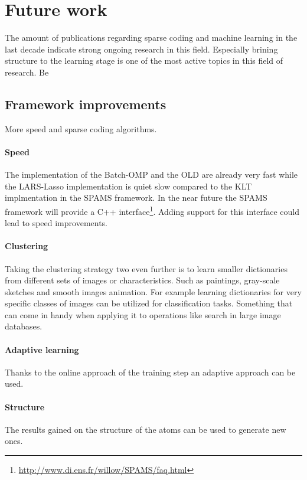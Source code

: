 \section{Future work}
The amount of publications regarding sparse coding and machine learning in the
last decade indicate strong ongoing research in this field. Especially
brining structure to the learning stage is one of the most active topics in this
field of research. Be



\subsection{Framework improvements}
More speed and sparse coding algorithms.
\paragraph{Speed}
The implementation of the Batch-OMP and the OLD are already very fast while the
LARS-Lasso implementation is quiet slow compared to the KLT implmentation in the
SPAMS framework. In the near future the SPAMS framework will provide a C++
interface\footnote{\url{http://www.di.ens.fr/willow/SPAMS/faq.html}}. Adding
support for this interface could lead to speed improvements.

\paragraph{Clustering}
Taking the clustering strategy two even further is to learn smaller dictionaries
from different sets of images or characteristics. Such as paintings, gray-scale
sketches and smooth images animation. For example learning dictionaries for very
specific classes of images can be utilized for classification tasks. Something
that can come in handy when applying it to operations like search in large image
databases.

\paragraph{Adaptive learning}
Thanks to the online approach of the training step an adaptive approach can be
used. 

\paragraph{Structure}
The results gained on the structure of the atoms can be used to generate new
ones.



